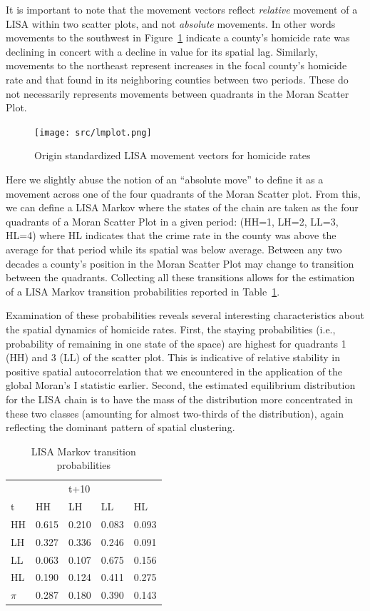 \documentclass[11pt, titlepage]{amsart}
\begin{document}
It is important to note that the movement vectors reflect
\emph{relative} movement of a LISA within two scatter plots, and not
\emph{absolute} movements.  In other words movements to the southwest in
Figure~\ref{f:lmplot} indicate a county's homicide rate was declining in
concert with a decline in value for its spatial lag. Similarly,
movements to the northeast represent increases in the focal county's
homicide rate and that found in its neighboring counties between two
periods. These do not necessarily represents movements between quadrants
in the Moran Scatter Plot.


\begin{figure}[ht]
\begin{center}
\texttt{[image: src/lmplot.png]}
\end{center}
\caption{Origin standardized LISA movement vectors for homicide rates}
\label{f:lmplot}
\end{figure}   

Here we slightly abuse the notion of an ``absolute move'' to define it as a
movement across one of the four quadrants of the Moran Scatter plot.
From this, we
can define a LISA Markov where the states of the chain
are taken as the four quadrants of a Moran Scatter Plot in a given
period: (HH=1, LH=2, LL=3, HL=4) where HL indicates that the crime rate
in the county was above the average for that period while its spatial
was below average.  Between any two decades a county's position in the
Moran Scatter Plot may change to transition between the quadrants.
Collecting all these transitions allows for the estimation of a LISA
Markov transition probabilities reported in Table~\ref{t:lm}. 

Examination of these probabilities reveals several interesting
characteristics about the spatial dynamics of homicide rates.  First,
the staying probabilities (i.e., probability of remaining in one state
of the space) are highest for quadrants 1 (HH)  and 3 (LL) of the scatter plot.
This is indicative of relative stability in positive spatial
autocorrelation that we encountered in the application of the global
Moran's I statistic earlier. Second, the estimated equilibrium
distribution for the LISA chain is to have the mass of the distribution
more concentrated in these two classes (amounting for almost two-thirds
of the distribution), again reflecting the dominant pattern of spatial
clustering.

\begin{table}
  \centering
  \small
\begin{tabular}{|l|llll|}\hline
  & &t+10 & &\\
  t&HH&LH&LL&HL\\
  \hline
HH&0.615 &0.210 &0.083 &0.093\\
LH&0.327 &0.336 &0.246 &0.091\\
LL&0.063 &0.107 &0.675 &0.156\\
HL&0.190 &0.124 &0.411 &0.275\\
\hline
$\pi$&0.287 &0.180 &0.390 &0.143\\
\hline
\end{tabular}
\caption{LISA Markov transition probabilities}
\label{t:lm}
\end{table}
\end{document}
